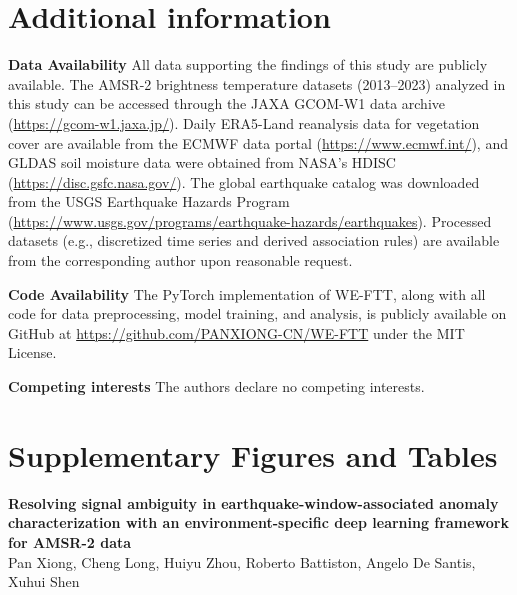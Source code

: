 \documentclass[preprint,review,12pt,authoryear]{elsarticle}
\begin{document}
\section*{Additional information}
\textbf{Data Availability} All data supporting the findings of this study are publicly available. The AMSR-2 brightness temperature datasets (2013--2023) analyzed in this study can be accessed through the JAXA GCOM-W1 data archive (\url{https://gcom-w1.jaxa.jp/}). Daily ERA5-Land reanalysis data for vegetation cover are available from the ECMWF data portal (\url{https://www.ecmwf.int/}), and GLDAS soil moisture data were obtained from NASA's HDISC (\url{https://disc.gsfc.nasa.gov/}). The global earthquake catalog was downloaded from the USGS Earthquake Hazards Program (\url{https://www.usgs.gov/programs/earthquake-hazards/earthquakes}). Processed datasets (e.g., discretized time series and derived association rules) are available from the corresponding author upon reasonable request.

\textbf{Code Availability} The PyTorch implementation of WE-FTT, along with all code for data preprocessing, model training, and analysis, is publicly available on GitHub at \url{https://github.com/PANXIONG-CN/WE-FTT} under the MIT License.

\textbf{Competing interests} The authors declare no competing interests.

\clearpage
\section*{Supplementary Figures and Tables}

\begin{center}
{\Large \textbf{Resolving signal ambiguity in earthquake-window-associated anomaly characterization with an environment-specific deep learning framework for AMSR-2 data}}\\[0.75em]
Pan Xiong, Cheng Long, Huiyu Zhou, Roberto Battiston, Angelo De Santis, Xuhui Shen
\end{center}

\vspace{1em}
\end{document}
